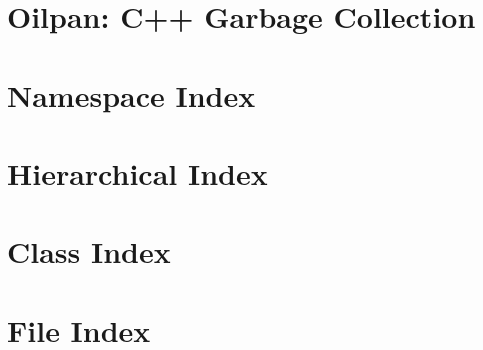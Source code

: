 \let\mypdfximage\pdfximage\def\pdfximage{\immediate\mypdfximage}\documentclass[twoside]{book}
\newcommand{\+}{\discretionary{\mbox{\scriptsize$\hookleftarrow$}}{}{}}
\begin{document}
\chapter{Oilpan\+: C++ Garbage Collection}
\label{md__tmp_V8SourceCode_include_cppgc_README}

\chapter{Namespace Index}

\chapter{Hierarchical Index}

\chapter{Class Index}

\chapter{File Index}

\end{document}
